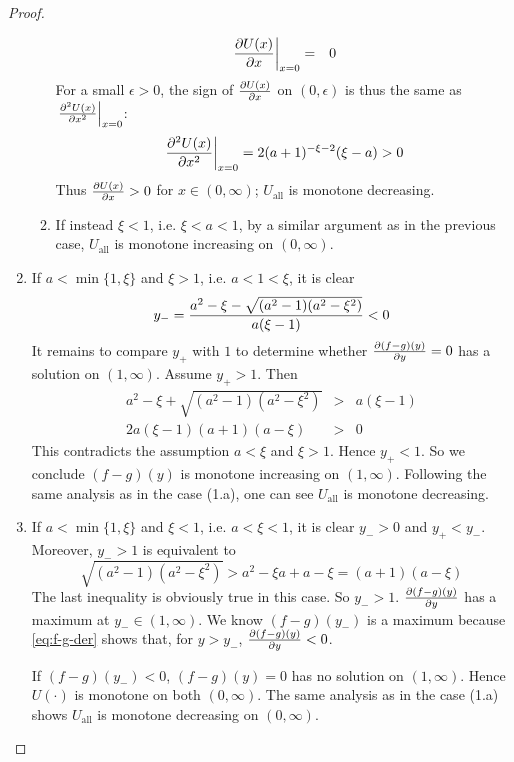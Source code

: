 \documentclass[11pt,a4]{amsart}
\newcommand{\pd}{\partial}
\newcommand{\1}{{\mathbf 1}}
\begin{document}
\begin{proof}
\begin{enumerate}
\begin{enumerate}
        \begin{eqnarray*}
          \left.{\pd U(x) \over \pd x}\right|_{x=0} &=& 0 \\
        \end{eqnarray*}
        For a small $\epsilon > 0$, the sign of ${\pd U(x) \over \pd
          x}$ on $(0, \epsilon)$ is thus the same as
        $\left.{\pd^2 U(x) \over \pd x^2}\right|_{x=0}$:
        \[
        \left.{\pd^2 U(x) \over \pd x^2}\right|_{x=0} =
        2 (a + 1)^{-\xi - 2} (\xi - a) > 0
        \]
        Thus ${\pd U(x) \over \pd x} > 0$ for $x \in (0, \infty)$;
        $U_{\text{all}}$ is monotone decreasing.
    \item If instead $\xi < 1$, i.e. $\xi < a < 1$, by a similar
      argument as in the previous case, $U_{\text{all}}$ is monotone
      increasing on $(0, \infty)$.
    \end{enumerate}
  \item If $a < \min\{1, \xi\}$ and $\xi > 1$, i.e. $a < 1 < \xi$, it
    is clear
    \[
    y_- = {
      a^2 - \xi - \sqrt{(a^2 - 1) (a^2 - \xi^2)}
      \over
      a (\xi - 1)
    } < 0
    \]
    It remains to compare $y_+$ with $1$ to determine whether
    ${\pd (f -g)(y) \over \pd y} = 0$ has a solution on $(1, \infty)$.
    Assume $y_+ > 1$. Then
    \begin{eqnarray}
      a^2 - \xi + \sqrt{(a^2 - 1) (a^2 - \xi^2)} &>& a (\xi - 1)
      \nonumber \\
      2 a (\xi - 1) (a + 1) (a - \xi) &>& 0 \label{eq:mi6}
    \end{eqnarray}
    This contradicts the assumption $a < \xi$ and $\xi > 1$. Hence
    $y_+ < 1$. So we conclude $(f - g)(y)$ is monotone increasing
    on $(1, \infty)$. Following the same analysis as in the case
    (1.a), one can see $U_{\text{all}}$ is monotone decreasing.

  \item If $a < \min\{1, \xi\}$ and $\xi < 1$, i.e. $a < \xi < 1$, it
    is clear $y_- > 0$ and $y_+ < y_-$. Moreover, $y_- > 1$ is equivalent
    to
    \[
    \sqrt{(a^2 - 1) (a^2 - \xi^2)} > a^2 - \xi a + a - \xi
    = (a + 1) (a - \xi)
    \]
    The last inequality is obviously true in this case. So $y_- >
    1$. ${\pd (f-g)(y) \over \pd y}$ has a maximum at
    $y_- \in (1, \infty)$. We know $(f - g)(y_-)$ is a maximum because
    \eqref{eq:f-g-der} shows that, for $y > y_-$,
    ${\pd (f-g)(y) \over \pd y} < 0$.

    If $(f-g)(y_-) < 0$, $(f-g)(y) = 0$ has no solution on $(1,
    \infty)$. Hence $U(\cdot)$ is monotone on both $(0, \infty)$.
    The same analysis as in the case (1.a) shows $U_{\text{all}}$
    is monotone decreasing on $(0, \infty)$.


\end{enumerate}
\end{proof}
\end{document}
